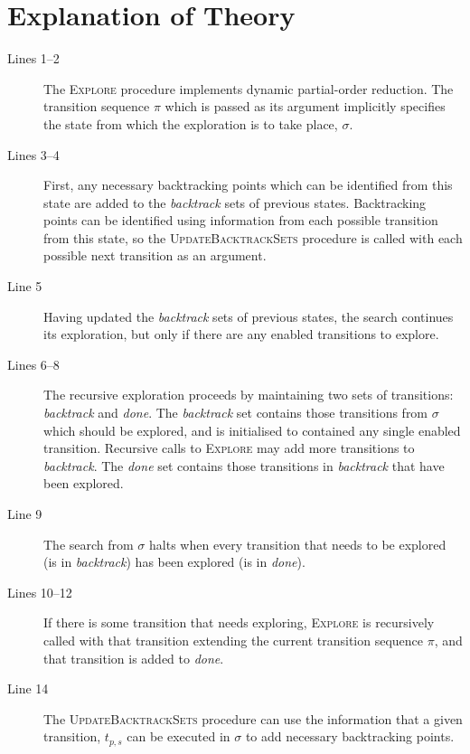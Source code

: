 \documentclass[12pt,a4paper,twoside,openany]{report}
\begin{document}
\section{Explanation of Theory}
\label{app:dpor-walkthrough}
\dporpseudocode
\begin{description}
	\item[Lines 1--2] The \textsc{Explore} procedure implements
	dynamic partial-order reduction. The transition sequence
	$\pi$ which is passed as its argument implicitly specifies the state
	from which the exploration is to take place, $\sigma$.

	\item[Lines 3--4] First, any necessary backtracking points
	which can be identified from this state are added to the
	\textit{backtrack} sets of previous states. Backtracking
	points can be identified using information from each possible
	transition from this state, so the \textsc{UpdateBacktrackSets}
	procedure is called with each possible next transition as an
	argument.

	\item[Line 5] Having updated the \textit{backtrack} sets
	of previous states, the search continues its exploration,
	but only if there are any enabled transitions to explore.

	\item[Lines 6--8] The recursive exploration proceeds by
	maintaining two sets of transitions: \textit{backtrack}
	and \textit{done}. The \textit{backtrack} set contains
	those transitions from $\sigma$ which should be explored,
	and is initialised to contained any single enabled transition.
	Recursive calls to
	\textsc{Explore} may add more transitions to \textit{backtrack}.
	The \textit{done} set contains those transitions
	in \textit{backtrack} that have been explored.

	\item[Line 9] The search from $\sigma$ halts when every
	transition that needs to be explored (is in \textit{backtrack})
	has been explored (is in \textit{done}).

	\item[Lines 10--12] If there is some transition that needs
	exploring, \textsc{Explore} is recursively called with that
	transition extending the current transition sequence $\pi$,
	and that transition is added to \textit{done}.

	\item[Line 14] The \textsc{UpdateBacktrackSets} procedure
	can use the information that a given transition, $t_{p,s}$ can be
	executed in $\sigma$ to add necessary backtracking points.


\end{description}
\end{document}
